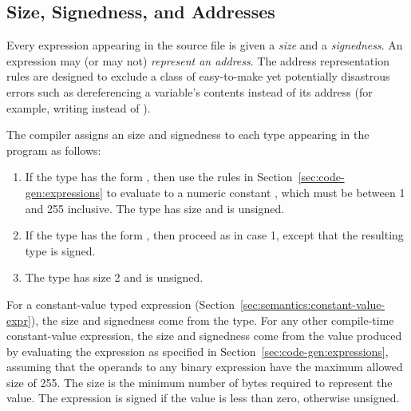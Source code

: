 \documentclass[10pt]{article}
\begin{document}
\subsection{Size, Signedness, and Addresses}
\label{sec:semantics:size}

Every expression appearing in the source file is given a \emph{size}
and a \emph{signedness}.  An expression may (or may not)
\emph{represent an address}.  The address representation rules are
designed to exclude a class of easy-to-make yet potentially disastrous
errors such as dereferencing a variable's contents instead of its
address (for example, writing  instead of
).

 The compiler
assigns an size and signedness to each type appearing in the program
as follows:
%
\begin{enumerate}
%
\item If the type has the form , then use the rules in
  Section~\ref{sec:code-gen:expressions} to evaluate  to
  a numeric constant , which must be between 1 and 255
  inclusive.  The type has size  and is unsigned.
%
\item If the type has the form  , then proceed as
  in case 1, except that the resulting type is signed.
%
\item The type  has size 2 and is unsigned.
%
\end{enumerate}

 For a
constant-value typed expression
(Section~\ref{sec:semantics:constant-value-expr}), the size and
signedness come from the type.  For any other compile-time
constant-value expression, the size and signedness come from the value
produced by evaluating the expression as specified in
Section~\ref{sec:code-gen:expressions}, assuming that the operands to
any binary expression have the maximum allowed size of 255.  The size
is the minimum number of bytes required to represent the value.  The
expression is signed if the value is less than zero, otherwise
unsigned.
\end{document}
